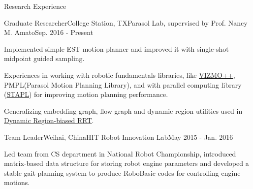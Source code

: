 \documentclass{resume} %
\begin{document}

\begin{rSection}{Research Experience}
\begin{rSubsection}{Graduate Researcher}{College Station, TX}{Parasol Lab, supervised by Prof. Nancy M. Amato}{Sep. 2016 - Present}
\item Implemented simple EST motion planner and improved it with single-shot midpoint guided sampling.
\item Experiences in working with robotic fundamentals libraries, like \href{https://parasol.tamu.edu/groups/amatogroup/research/UserGuided/Old/vizmo++/}{VIZMO++}, PMPL(Parasol Motion Planning Library), and with parallel computing library (\href{https://parasol.tamu.edu/groups/rwergergroup/research/stapl/}{STAPL}) for improving motion planning performance.
\item Generalizing embedding graph, flow graph and dynamic region utilities used in \href{http://wafr2016.berkeley.edu/papers/WAFR_2016_paper_36.pdf}{Dynamic Region-biased RRT}.
\end{rSubsection}

\begin{rSubsection}{Team Leader}{Weihai, China}{HIT Robot Innovation Lab}{May 2015 - Jan. 2016}
\item Led team from CS department in National Robot Championship, introduced matrix-based data structure for storing robot engine parameters and developed a stable gait planning system to produce RoboBasic codes for controlling engine motions.
\end{rSubsection}

\end{rSection}
\end{document}
